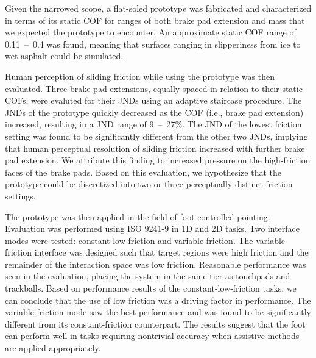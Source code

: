 \documentclass [12pt,letterpaper]{report}
\begin{document}
Given the narrowed scope, a flat-soled prototype was fabricated and characterized in terms of its static COF for ranges of both brake pad extension and mass that we expected the prototype to encounter. An approximate static COF range of 0.11~--~0.4 was found, meaning that surfaces ranging in slipperiness from ice to wet asphalt could be simulated.

Human perception of sliding friction while using the prototype was then evaluated. Three brake pad extensions, equally spaced in relation to their static COFs, were evaluted for their JNDs using an adaptive staircase procedure. The JNDs of the prototype quickly decreased as the COF (i.e., brake pad extension) increased, resulting in a JND range of 9~--~27\%. The JND of the lowest friction setting was found to be significantly different from the other two JNDs, implying that human perceptual resolution of sliding friction increased with further brake pad extension. We attribute this finding to increased pressure on the high-friction faces of the brake pads. Based on this evaluation, we hypothesize that the prototype could be discretized into two or three perceptually distinct friction settings.

The prototype was then applied in the field of foot-controlled pointing. Evaluation was performed using ISO 9241-9 in 1D and 2D tasks. Two interface modes were tested: constant low friction and variable friction. The variable-friction interface was designed such that target regions were high friction and the remainder of the interaction space was low friction. Reasonable performance was seen in the evaluation, placing the system in the same tier as touchpads and trackballs. Based on performance results of the constant-low-friction tasks, we can conclude that the use of low friction was a driving factor in performance. The variable-friction mode saw the best performance and was found to be significantly different from its constant-friction counterpart. The results suggest that the foot can perform well in tasks requiring nontrivial accuracy when assistive methods are applied appropriately.



%



\typeout{}
\begin{singlespace}
  
  
\end{singlespace}
\end{document}
